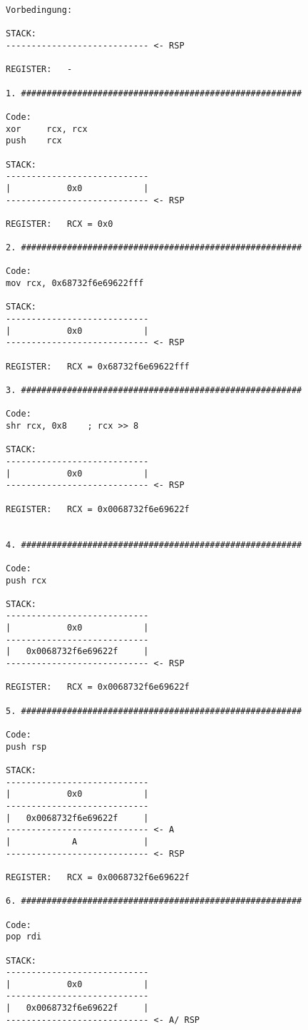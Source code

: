 \documentclass[12pt]{article}
\begin{document}
\begin{lstlisting}
Vorbedingung:

STACK:
---------------------------- <- RSP

REGISTER:   -

1. #######################################################

Code:
xor     rcx, rcx
push    rcx

STACK:
----------------------------
|           0x0            |
---------------------------- <- RSP

REGISTER:   RCX = 0x0

2. #######################################################

Code:
mov rcx, 0x68732f6e69622fff

STACK:
----------------------------
|           0x0            |
---------------------------- <- RSP

REGISTER:   RCX = 0x68732f6e69622fff

3. #######################################################

Code:
shr rcx, 0x8    ; rcx >> 8

STACK:
----------------------------
|           0x0            |
---------------------------- <- RSP

REGISTER:   RCX = 0x0068732f6e69622f


4. #######################################################

Code:
push rcx

STACK:
----------------------------
|           0x0            |
----------------------------
|   0x0068732f6e69622f     |
---------------------------- <- RSP

REGISTER:   RCX = 0x0068732f6e69622f

5. #######################################################

Code:
push rsp

STACK:
----------------------------
|           0x0            |
----------------------------
|   0x0068732f6e69622f     |
---------------------------- <- A
|            A             |
---------------------------- <- RSP

REGISTER:   RCX = 0x0068732f6e69622f

6. #######################################################

Code:
pop rdi

STACK:
----------------------------
|           0x0            |
----------------------------
|   0x0068732f6e69622f     |
---------------------------- <- A/ RSP


\end{lstlisting}
\end{document}
